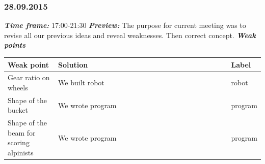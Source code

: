 \subsubsection{28.09.2015}
	\textit{\textbf{Time frame:}} 17:00-21:30 \newline
	\textit{\textbf{Preview:}} The purpose for current meeting was to revise all our previous ideas and reveal weaknesses. Then correct concept.\newline \newline
	\textit{\textbf{Weak points}}

  \begin{table}[H]
	\vspace{-2mm}
	\begin{center}
		\begin{tabular}{|p{0.2\linewidth}|p{0.7\linewidth}|p{0.1\linewidth}|}
			\hline
			Weak point & Solution & Label \\
			\hline
			Gear ratio on wheels & We built robot & robot \\
			\hline
			Shape of the bucket & We wrote program & program \\
			\hline
			Shape of the beam for scoring alpinists & We wrote program & program \\
			\hline
		\end{tabular}
	\end{center}
  \end{table}
  
